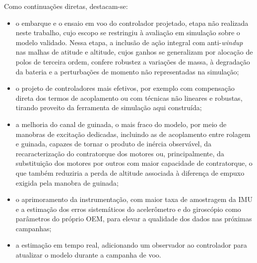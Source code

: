 Como continuações diretas, destacam-se:
\begin{itemize}
    \item o embarque e o ensaio em voo do controlador projetado, etapa não realizada neste trabalho, cujo escopo se restringiu à avaliação em simulação sobre o modelo validado. Nessa etapa, a inclusão de ação integral com anti-\textit{windup} nas malhas de atitude e altitude, cujos ganhos se generalizam por alocação de polos de terceira ordem, confere robustez a variações de massa, à degradação da bateria e a perturbações de momento não representadas na simulação;
    \item o projeto de controladores mais efetivos, por exemplo com compensação direta dos termos de acoplamento ou com técnicas não lineares e robustas, tirando proveito da ferramenta de simulação aqui construída;
    \item a melhoria do canal de guinada, o mais fraco do modelo, por meio de manobras de excitação dedicadas{\color{blue}, incluindo as de acoplamento entre rolagem e guinada, capazes de tornar o produto de inércia observável}, da recaracterização do contratorque dos motores ou, principalmente, da substituição dos motores por outros com maior capacidade de contratorque{\color{blue}, o que também reduziria a perda de altitude associada à diferença de empuxo exigida pela manobra de guinada};
    \item o aprimoramento da instrumentação, com maior taxa de amostragem da IMU e a estimação dos erros sistemáticos do acelerômetro e do giroscópio como parâmetros do próprio OEM, para elevar a qualidade dos dados nas próximas campanhas;
    \item a estimação em tempo real, adicionando um observador ao controlador para atualizar o modelo durante a campanha de voo.
\end{itemize}
